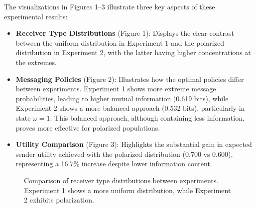 \documentclass[12pt]{article}
\theoremstyle{plain}
\theoremstyle{definition}
\theoremstyle{remark}
\begin{document}
The visualizations in Figures 1--3 illustrate three key aspects of these experimental results:

\begin{itemize}
    \item \textbf{Receiver Type Distributions} (Figure 1): Displays the clear contrast between the uniform distribution in Experiment 1 and the polarized distribution in Experiment 2, with the latter having higher concentrations at the extremes.
    
    \item \textbf{Messaging Policies} (Figure 2): Illustrates how the optimal policies differ between experiments. Experiment 1 shows more extreme message probabilities, leading to higher mutual information (0.619 bits), while Experiment 2 shows a more balanced approach (0.532 bits), particularly in state $\omega=1$. This balanced approach, although containing less information, proves more effective for polarized populations.
    
    \item \textbf{Utility Comparison} (Figure 3): Highlights the substantial gain in expected sender utility achieved with the polarized distribution (0.700 vs 0.600), representing a 16.7\% increase despite lower information content.
\end{itemize}

\begin{figure}[htbp]
\centering
{}
\caption{Comparison of receiver type distributions between experiments. Experiment 1 shows a more uniform distribution, while Experiment 2 exhibits polarization.}
\label{fig:type-distributions}
\end{figure}
\end{document}
